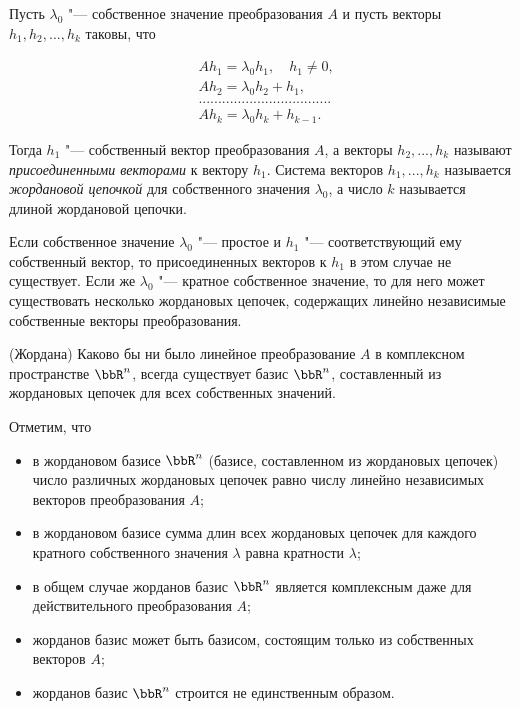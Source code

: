 \begin{defn}
Пусть $\lambda_0$ "--- собственное значение преобразования $A$ и пусть векторы $h_1,h_2,...,h_k$ таковы, что 

\begin{equation} \label{27eq2.3}
\begin{aligned}
&Ah_1=\lambda_0h_1,\quad h_1\neq 0,\\
&Ah_2=\lambda_0h_2+h_1,\\
&..................................\\
&Ah_k=\lambda_0h_k+h_{k-1}.
\end{aligned}
\end{equation}

Тогда $h_1$ "--- собственный вектор преобразования $A$, а векторы $h_2,...,h_k$ называют \textit{присоединенными векторами} к вектору $h_1$. Система векторов $h_1,...,h_k$ называется \textit{жордановой цепочкой} для собственного значения $\lambda_0$, а число $k$ называется длиной жордановой цепочки.

Если собственное значение $\lambda_0$ "--- простое и $h_1$ "--- соответствующий ему собственный вектор, то присоединенных векторов к $h_1$ в этом случае не существует. Если же $\lambda_0$ "--- кратное собственное значение, то для него может существовать несколько жордановых цепочек, содержащих линейно независимые собственные векторы преобразования.   

\end{defn}

\begin{thm}\label{27thmJ} (Жордана)
Каково бы ни было линейное преобразование $A$ в комплексном пространстве $\bbR^n$, всегда существует базис $\bbR^n$, составленный из жордановых цепочек для всех собственных значений.
\end{thm}

Отметим, что 
\begin{itemize} 
\item в жордановом базисе $\bbR^n$ (базисе, составленном из жордановых цепочек) число различных жордановых цепочек равно числу линейно независимых векторов преобразования $A$;
\item в жордановом базисе сумма длин всех жордановых цепочек для каждого кратного собственного значения $\lambda$ равна кратности $\lambda$;
\item в общем случае жорданов базис $\bbR^n$ является комплексным даже для действительного преобразования $A$;
\item жорданов базис может быть базисом, состоящим только из собственных векторов $A$;
\item жорданов базис $\bbR^n$ строится не единственным образом.
\end{itemize}

